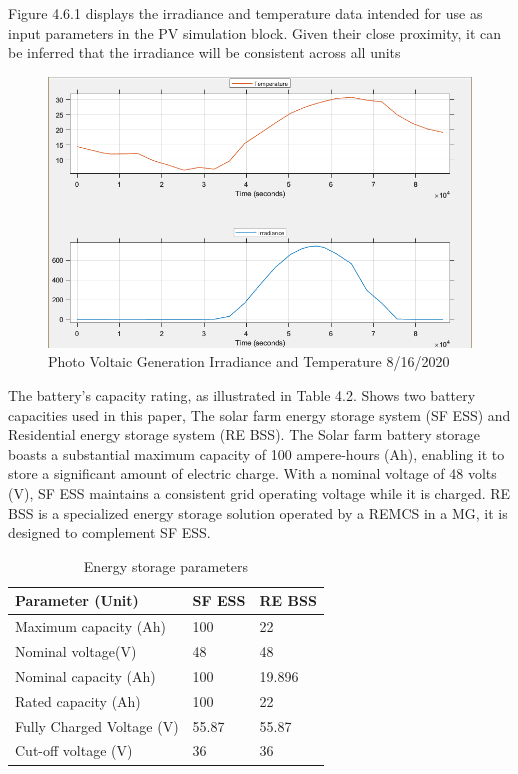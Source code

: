 Figure 4.6.1 displays the irradiance and temperature data intended for use as input parameters in the PV simulation block. Given their close proximity, it can be inferred that the irradiance will be consistent across all units
\begin{figure}[H]
	\centering
	\includegraphics[totalheight=8cm]{Figures/irradiance.png}
	\caption{Photo Voltaic Generation Irradiance and Temperature 8/16/2020\cite{41}}
\end{figure}
The battery's capacity rating, as illustrated in Table 4.2. Shows two battery capacities used in this paper, The solar farm energy storage system (SF ESS) and Residential energy storage system (RE BSS). The Solar farm battery storage boasts a substantial maximum capacity of 100 ampere-hours (Ah), enabling it to store a significant amount of electric charge. With a nominal voltage of 48 volts (V), SF ESS maintains a consistent grid operating voltage while it is charged. RE BSS is a specialized energy storage solution operated by a REMCS in a MG, it is designed to complement SF ESS.

\begin{center}
	\begin{table}[!ht]
		\begin{center}
			\caption{Energy storage parameters}
			\begin{tabular}{|p{6cm}|p{4cm}|p{4cm}|} %
				\hline
				\textbf{Parameter (Unit)} & \textbf{SF ESS} & \textbf{RE BSS}\\
				\hline
				Maximum capacity (Ah) & 100 & 22\\
				\hline
				Nominal voltage(V) & 48 & 48\\
				\hline
				Nominal capacity (Ah) & 100 & 19.896\\
				\hline
				Rated capacity (Ah) & 100 & 22\\
				\hline
				Fully Charged Voltage (V) & 55.87 & 55.87\\
				\hline
				Cut-off voltage (V) & 36 & 36\\
				\hline
			\end{tabular}
		\end{center}
	\end{table}
\end{center}

